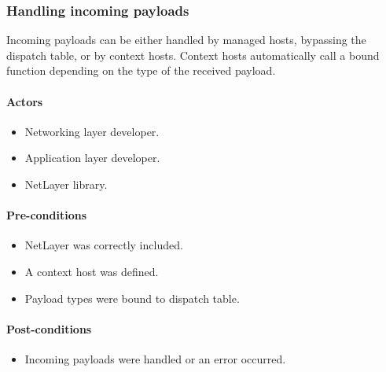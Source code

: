 \documentclass[11pt]{report}
\newcommand{\+}{\discretionary{\mbox{\scriptsize$\hookleftarrow$}}{}{}}
\begin{document}
                \subsubsection{Handling incoming payloads}
                    
                    Incoming payloads can be either handled by managed hosts, bypassing the dispatch table, or by context hosts. 
                    Context hosts automatically call a bound function depending on the type of the received payload.

                    \paragraph{Actors}
                        \begin{itemize}
                            \item Networking layer developer.
                            \item Application layer developer.
                            \item NetLayer library.
                        \end{itemize}

                    \paragraph{Pre-conditions}
                        \begin{itemize}
                            \item NetLayer was correctly included.
                            \item A context host was defined.
                            \item Payload types were bound to dispatch table.
                        \end{itemize}

                    \paragraph{Post-conditions}
                        \begin{itemize}
                            \item Incoming payloads were handled or an error occurred.
                        \end{itemize}
\end{document}
